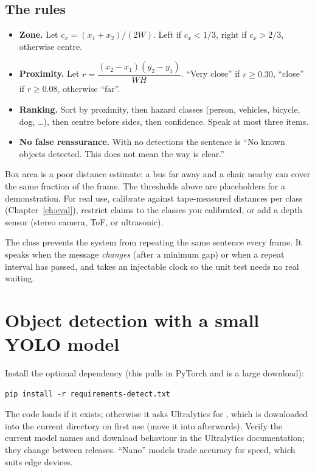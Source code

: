 \subsection{The rules}
\begin{itemize}
  \item \textbf{Zone.} Let $c_x=(x_1+x_2)/(2W)$. Left if $c_x<1/3$, right if $c_x>2/3$, otherwise centre.
  \item \textbf{Proximity.} Let $r=\dfrac{(x_2-x_1)(y_2-y_1)}{WH}$. ``Very close'' if $r\ge0.30$, ``close'' if $r\ge0.08$, otherwise ``far''.
  \item \textbf{Ranking.} Sort by proximity, then hazard classes (person, vehicles, bicycle, dog, \dots), then centre before sides, then confidence. Speak at most three items.
  \item \textbf{No false reassurance.} With no detections the sentence is ``No known objects detected. This does not mean the way is clear.''
\end{itemize}
\begin{warnbox}
Box area is a poor distance estimate: a bus far away and a chair nearby can cover the same fraction of the frame. The thresholds above are placeholders for a demonstration. For real use, calibrate against tape-measured distances per class (Chapter~\ref{ch:eval}), restrict claims to the classes you calibrated, or add a depth sensor (stereo camera, ToF, or ultrasonic).
\end{warnbox}


The  class prevents the system from repeating the same sentence every frame. It speaks when the message \emph{changes} (after a minimum gap) or when a repeat interval has passed, and takes an injectable clock so the unit test needs no real waiting.

\section{Object detection with a small YOLO model}
Install the optional dependency (this pulls in PyTorch and is a large download):
\begin{lstlisting}[style=sh]
pip install -r requirements-detect.txt
\end{lstlisting}
The code loads  if it exists; otherwise it asks Ultralytics for , which is downloaded into the current directory on first use (move it into  afterwards). Verify the current model names and download behaviour in the Ultralytics documentation; they change between releases. ``Nano'' models trade accuracy for speed, which suits edge devices.


